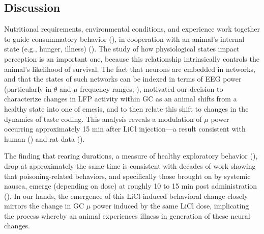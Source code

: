 \begin{refsection}
\section{Discussion}
Nutritional requirements, environmental conditions, and experience work together to guide consummatory behavior (\cite{parker1982a,provenza1995a,flores2018a}), in cooperation with an animal’s internal state (e.g., hunger, illness) (\cite{livneh2020a}). The study of how physiological states impact perception is an important one, because this relationship intrinsically controls the animal’s likelihood of survival. The fact that neurons are embedded in networks, and that the states of such networks can be indexed in terms of EEG power (particularly in \(\theta\) and \(\mu\) frequency ranges; \cite{fontanini2005a,fontanini2006a,fontanini2008a}), motivated our decision to characterize changes in LFP activity within GC as an animal shifts from a healthy state into one of emesis, and to then relate this shift to changes in the dynamics of taste coding. This analysis reveals a modulation of \(\mu\) power occurring approximately 15 min after LiCl injection—a result consistent with human (\cite{chen2010a}) and rat data (\cite{aguilar-rivera2020a}).

The finding that rearing durations, a measure of healthy exploratory behavior (\cite{parker1982a,tomasiewicz2006a,l2019a,aguilar-rivera2020a,alves2005a,rosana2012a}), drop at approximately the same time is consistent with decades of work showing that poisoning-related behaviors, and specifically those brought on by systemic nausea, emerge (depending on dose) at roughly 10 to 15 min post administration (\cite{parker1982a,nachman1963a,nachman1973a,aguilar-rivera2020a}). In our hands, the emergence of this LiCl-induced behavioral change closely mirrors the change in GC \(\mu\) power induced by the same LiCl dose, implicating the process whereby an animal experiences illness in generation of these neural changes.


\end{refsection}
